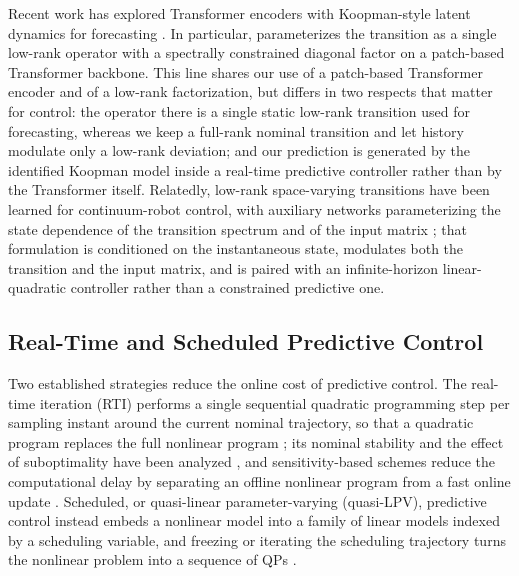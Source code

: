 Recent work has explored Transformer encoders with Koopman-style latent dynamics for forecasting \cite{forootani2026deepkoopformer, forootani2026spectral}. In particular, \cite{forootani2026spectral} parameterizes the transition as a single low-rank operator with a spectrally constrained diagonal factor on a patch-based Transformer backbone. This line shares our use of a patch-based Transformer encoder and of a low-rank factorization, but differs in two respects that matter for control: the operator there is a single static low-rank transition used for forecasting, whereas we keep a full-rank nominal transition and let history modulate only a low-rank deviation; and our prediction is generated by the identified Koopman model inside a real-time predictive controller rather than by the Transformer itself. Relatedly, low-rank space-varying transitions have been learned for continuum-robot control, with auxiliary networks parameterizing the state dependence of the transition spectrum and of the input matrix \cite{feizi2025deepkoopman}; that formulation is conditioned on the instantaneous state, modulates both the transition and the input matrix, and is paired with an infinite-horizon linear-quadratic controller rather than a constrained predictive one.

\subsection{Real-Time and Scheduled Predictive Control}

Two established strategies reduce the online cost of predictive control. The real-time iteration (RTI) performs a single sequential quadratic programming step per sampling instant around the current nominal trajectory, so that a quadratic program replaces the full nonlinear program \cite{diehl2005realtime, gros2020rti}; its nominal stability and the effect of suboptimality have been analyzed \cite{diehl2005rtistability}, and sensitivity-based schemes reduce the computational delay by separating an offline nonlinear program from a fast online update \cite{zavala2009advancedstep}. Scheduled, or quasi-linear parameter-varying (quasi-LPV), predictive control instead embeds a nonlinear model into a family of linear models indexed by a scheduling variable, and freezing or iterating the scheduling trajectory turns the nonlinear problem into a sequence of QPs \cite{rugh2000gain, leith1998velocity, cisneros2016qlmpc, cisneros2020qlpv}.

